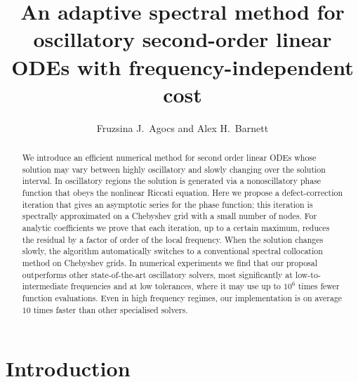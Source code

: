 \documentclass[10pt]{article}
\begin{document}
\title{An adaptive spectral method for oscillatory second-order linear ODEs with frequency-independent cost }

\author{Fruzsina J.\ Agocs and Alex H.\ Barnett}
\maketitle

\begin{abstract}



We introduce an efficient numerical method for second order linear ODEs whose
solution may vary between highly oscillatory and slowly changing over the solution interval.
%
In oscillatory regions the solution is generated via a nonoscillatory phase
function that obeys the nonlinear Riccati equation. Here we propose a
defect-correction iteration that gives an asymptotic series for the phase
function; this iteration is spectrally approximated on a Chebyshev grid with a small number of nodes.
%
For analytic coefficients we prove that each iteration, up to a certain
maximum, reduces the residual by a factor of order of the local frequency. 
%
When the solution changes slowly, the algorithm automatically switches to a
conventional spectral collocation method on Chebyshev grids.
%
In numerical experiments we find that our proposal outperforms other state-of-the-art
oscillatory solvers, most significantly at low-to-intermediate
frequencies and at low tolerances, where it may use up to $10^6$
times fewer function evaluations.  Even in high frequency regimes, our
implementation is
on average $10$ times faster than other specialised solvers.
\end{abstract}

\section{Introduction}
\end{document}
